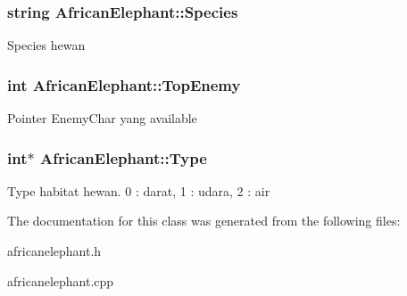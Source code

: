 \subsubsection[{\texorpdfstring{Species}{Species}}]{\setlength{\rightskip}{0pt plus 5cm}string African\+Elephant\+::\+Species\hspace{0.3cm}{\ttfamily [protected]}}\hypertarget{class_african_elephant_a8905a3a9580267fe09d57e0f00b63e63}{}\label{class_african_elephant_a8905a3a9580267fe09d57e0f00b63e63}
Species hewan 
\subsubsection[{\texorpdfstring{Top\+Enemy}{TopEnemy}}]{\setlength{\rightskip}{0pt plus 5cm}int African\+Elephant\+::\+Top\+Enemy\hspace{0.3cm}{\ttfamily [protected]}}\hypertarget{class_african_elephant_aafbdcab021159fa5389733a917524d5e}{}\label{class_african_elephant_aafbdcab021159fa5389733a917524d5e}
Pointer Enemy\+Char yang available 
\subsubsection[{\texorpdfstring{Type}{Type}}]{\setlength{\rightskip}{0pt plus 5cm}int$\ast$ African\+Elephant\+::\+Type\hspace{0.3cm}{\ttfamily [protected]}}\hypertarget{class_african_elephant_a44b4d4298c137251455b18b85cd047f6}{}\label{class_african_elephant_a44b4d4298c137251455b18b85cd047f6}
Type habitat hewan. 0 \+: darat, 1 \+: udara, 2 \+: air 

The documentation for this class was generated from the following files\+:\begin{DoxyCompactItemize}
\item 
africanelephant.\+h\item 
africanelephant.\+cpp\end{DoxyCompactItemize}
